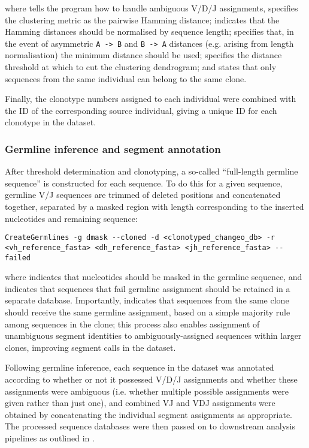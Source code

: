 \noindent where  tells the program how to handle ambiguous V/D/J assignments,  specifies the clustering metric as the pairwise Hamming distance;  indicates that the Hamming distances should be normalised by sequence length;  specifies that, in the event of asymmetric \texttt{A -> B} and \texttt{B -> A} distances (e.g. arising from length normalisation) the minimum distance should be used;  specifies the distance threshold at which to cut the clustering dendrogram; and  states that only sequences from the same individual can belong to the same clone.

Finally, the clonotype numbers assigned to each individual were combined with the ID of the corresponding source individual, giving a unique ID for each clonotype in the dataset.

\subsubsection{Germline inference and segment annotation}
\label{sec:methods_comp_igpreproc_germ}

After threshold determination and clonotyping, a so-called ``full-length germline sequence'' is constructed for each sequence. To do this for a given sequence, germline V/J sequences are trimmed of deleted positions and concatenated together, separated by a masked region with length corresponding to the inserted nucleotides and remaining \dh sequence:

\begin{lstlisting}
CreateGermlines -g dmask --cloned -d <clonotyped_changeo_db> -r <vh_reference_fasta> <dh_reference_fasta> <jh_reference_fasta> --failed
\end{lstlisting}

\noindent where  indicates that \dh nucleotides should be masked in the germline sequence, and  indicates that sequences that fail germline assignment should be retained in a separate database. Importantly,  indicates that sequences from the same clone should receive the same germline assignment, based on a simple majority rule among sequences in the clone; this process also enables assignment of unambiguous segment identities to ambiguously-assigned sequences within larger clones, improving segment calls in the dataset. 

Following germline inference, each sequence in the dataset was annotated according to whether or not it possessed V/D/J assignments and whether these assignments were ambiguous (i.e. whether multiple possible assignments were given rather than just one), and combined VJ and VDJ assignments were obtained by concatenating the individual segment assignments as appropriate. The processed sequence databases were then passed on to downstream analysis pipelines as outlined in .

